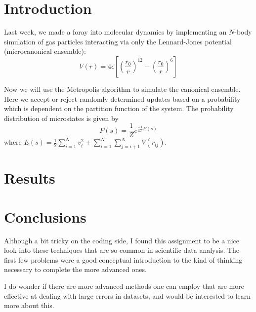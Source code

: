 \documentclass{article}
\author{\hwauthor}
\title{\hwtitle}
\date{\hwdate}
\begin{document}
\maketitle
\thispagestyle{fancy}

\section{Introduction}

Last week, we made a foray into molecular dynamics by implementing an $N$-body simulation of gas particles interacting via only the Lennard-Jones potential (microcanonical ensemble): \begin{equation}
   V(r)=4\epsilon\left[\left(\frac{r_0}{r}\right)^{12} - \left(\frac{r_0}{r}\right)^6\right]
\end{equation}

Now we will use the Metropolis algorithm to simulate the canonical ensemble. Here we accept or reject randomly determined updates based on a probability which is dependent on the partition function of the system. The probability distribution of microstates is given by \begin{equation}
   P(s)=\frac{1}{Z}e^{\frac{-1}{kT}E(s)}
\end{equation}
where $\displaystyle E(s)=\frac{1}{2}\sum_{i=1}^{N} v_{i}^2 + \sum_{i=1}^{N} \sum_{j=i+1}^{N} V(r_{ij})$.

\section{Results}

\bigskip
{}
\medskip


\bigskip
{}
\medskip


\bigskip
{}
\medskip


\bigskip
{}
\medskip



\section{Conclusions}

Although a bit tricky on the coding side, I found this assignment to be a nice look into these techniques that are so common in scientific data analysis. The first few problems were a good conceptual introduction to the kind of thinking necessary to complete the more advanced ones.

I do wonder if there are more advanced methods one can employ that are more effective at dealing with large errors in datasets, and would be interested to learn more about this.
\end{document}
